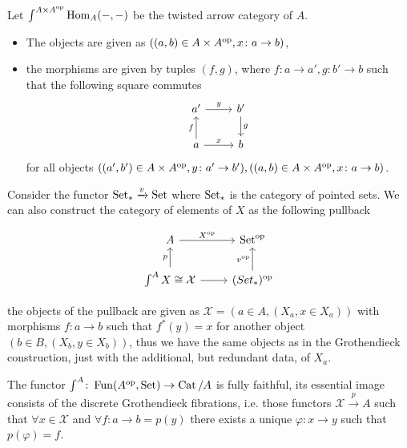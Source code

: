 \begin{exmp}	
	Let $ \int^{ A \times A^{ \operatorname{op} }} \operatorname{Hom}_A ( - , - ) $ be the twisted arrow category of $ A $.
	\begin{itemize}
		\item 
		The objects are given as $ ( ( a , b ) \in  A \times A^{\operatorname{op}}, x \colon a \to b ) $,
		
		\item 
		the morphisms are given by tuples $ ( f , g ) $, where $ f \colon a \to a' , g \colon b' \to b $ such that the following square commutes
		\[
		\begin{tikzcd}	
			a'
			\ar[r, " y " ]
			&
			b'
			\ar[d, " g "]
			\\
			a 
			\ar[ u , " f" ]
			\ar[r, " x" ]
			&
			b
		\end{tikzcd}
		\]
		for all objects $ ( ( a' , b' ) \in A \times A^{ \operatorname{op} } , y \colon a' \to b' ), ( ( a , b ) \in A \times A^{ \operatorname{op} }, x \colon a \to b )$.
	\end{itemize}

	Consider the functor $ \operatorname{Set}_* \xrightarrow{ v } \operatorname{Set} $ where $ \operatorname{Set}_* $ is the category of pointed sets.
	We can also construct the category of elements of $ X $ as the following pullback
	
	\[
	\begin{tikzcd}
		A
		\ar[r, " X^{ \op } "]
		&
		\Set^{ \op }
		\\
		\int^A X \cong \mathcal{ X }
		\ar[u , " p " ]
		\ar[r]
		&
		( Set_* )^{ \op }
		\ar[u, " v^{ \op } "]
	\end{tikzcd}
	\]
	
	the objects of the pullback are given as $ \mathcal{ X } = ( a \in A , ( X_a, x \in X_a )) $
	with morphisms $ f\colon a \to b $ such that $ f^* ( y ) = x $ for another object $ ( b \in B , ( X_b , y \in X_b ))$, thus we have the same objects as in the Grothendieck construction, just with the additional, but redundant data, of $ X_a $.
\end{exmp}


\begin{thm}
	The functor $ \int^A \colon \operatorname{Fun} ( A^{ \operatorname{op} } , \operatorname{Set} ) \to \operatorname{Cat}/A $ is fully faithful,
	its essential image consists of the discrete Grothendieck fibrations, i.e. those functors 
	$ \mathcal{ X } \xrightarrow{ p } A $ such that $ \forall x \in \mathcal{ X } $ and $ \forall f \colon a \to b = p ( y) $ there exists a unique $ \varphi \colon x \to y  $ such that $ p( \varphi ) = f $.
\end{thm} 

